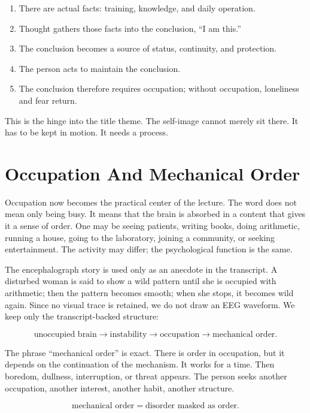 \begin{enumerate}
\item There are actual facts: training, knowledge, and daily operation.
\item Thought gathers those facts into the conclusion, ``I am this.''
\item The conclusion becomes a source of status, continuity, and protection.
\item The person acts to maintain the conclusion.
\item The conclusion therefore requires occupation; without occupation, loneliness and fear return.
\end{enumerate}

This is the hinge into the title theme. The self-image cannot merely sit there. It has to be kept in motion. It needs a process.

\section{Occupation And Mechanical Order}

Occupation now becomes the practical center of the lecture. The word does not mean only being busy. It means that the brain is absorbed in a content that gives it a sense of order. One may be seeing patients, writing books, doing arithmetic, running a house, going to the laboratory, joining a community, or seeking entertainment. The activity may differ; the psychological function is the same.

The encephalograph story is used only as an anecdote in the transcript. A disturbed woman is said to show a wild pattern until she is occupied with arithmetic; then the pattern becomes smooth; when she stops, it becomes wild again. Since no visual trace is retained, we do not draw an EEG waveform. We keep only the transcript-backed structure:

\begin{equation}
\text{unoccupied brain}
\longrightarrow
\text{instability}
\longrightarrow
\text{occupation}
\longrightarrow
\text{mechanical order}.
\end{equation}

The phrase ``mechanical order'' is exact. There is order in occupation, but it depends on the continuation of the mechanism. It works for a time. Then boredom, dullness, interruption, or threat appears. The person seeks another occupation, another interest, another habit, another structure.

\begin{equation}
\text{mechanical order}
=
\text{disorder masked as order}.
\end{equation}

